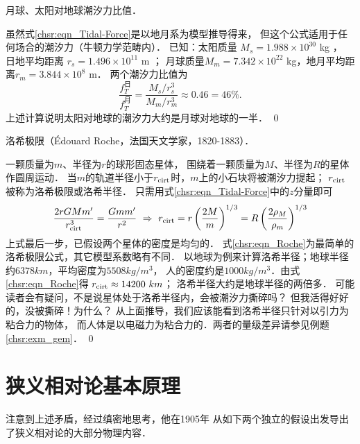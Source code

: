 \begin{example}
    月球、太阳对地球潮汐力比值．
\end{example}
虽然式\eqref{chsr:eqn_Tidal-Force}是以地月系为模型推导得来，
但这个公式适用于任何场合的潮汐力（牛顿力学范畴内）．
已知：太阳质量 $M_{s}=1.988\times 10^{30}  $ \si{kg} ，
日地平均距离 $r_s= 1.496\times 10^{11} $ \si{m} ；
月球质量$M_{m} =7.342\times 10^{22}$ \si{kg}，地月平均距离$r_m=3.844 \times 10^8$ \si{m}．
两个潮汐力比值为
\begin{equation}
    \frac{f^{\text{日}}_T}{f^{\text{月}}_T} = \frac{ M_s/r_s^3 }{M_m/r_m^3}
    \approx 0.46 = 46 \% .
\end{equation}
上述计算说明太阳对地球的潮汐力大约是月球对地球的一半． \qed

\begin{example}\label{chsr:exam_Roche}
    洛希极限（\'{E}douard Roche，法国天文学家，1820-1883）．
\end{example}
一颗质量为$m$、半径为$r$的球形固态星体，
围绕着一颗质量为$M$、半径为$R$的星体作圆周运动．
当$m$的轨道半径小于$r_{\rm cirt}$时，$m$上的小石块将被潮汐力提起；
$r_{\rm cirt}$被称为洛希极限或洛希半径．
只需用式\eqref{chsr:eqn_Tidal-Force}中的$z$分量即可
\begin{equation}\label{chsr:eqn_Roche}
    \frac{2r GM m' }{r^3_{\rm cirt}} =  \frac{ Gm m' }{r^2}
    \ \Rightarrow \ 
    r_{\rm cirt} = r \left(\frac{2M}{m}\right)^{1/3} 
    = R \left(\frac{2 \rho_M}{\rho_m}\right)^{1/3} 
\end{equation}
上式最后一步，已假设两个星体的密度是均匀的．
式\eqref{chsr:eqn_Roche}为最简单的洛希极限公式，其它模型系数略有不同．
以地球为例来计算洛希半径；地球半径约$6378 km$，平均密度为$5508 kg/m^3$，
人的密度约是$1000 kg/m^3$．由式\eqref{chsr:eqn_Roche}得
$    r_{\rm cirt} \approx 14200\ km $；
洛希半径大约是地球半径的两倍多．
可能读者会有疑问，不是说星体处于洛希半径内，会被潮汐力撕碎吗？
但我活得好好的，没被撕碎！为什么？
从上面推导，我们应该能看到洛希半径只针对以引力为粘合力的物体，
而人体是以电磁力为粘合力的．两者的量级差异请参见例题\ref{chsr:exm_gem}．
\qed


\section{狭义相对论基本原理}\label{chsr:sec_srf}
\textcite[附录II.6]{einstein_sg}注意到上述矛盾，经过缜密地思考，他在1905年
从如下两个独立的假设出发导出了狭义相对论的大部分物理内容．

 

